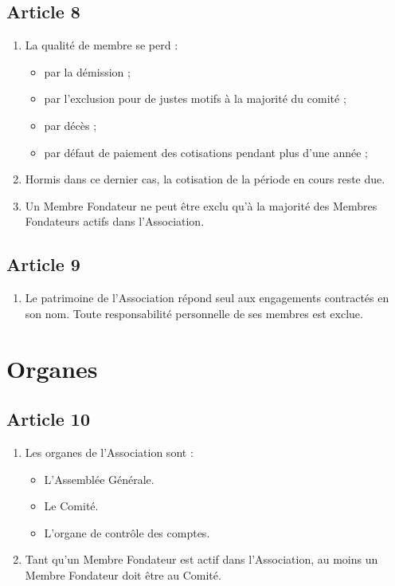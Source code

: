 \documentclass[12pt,twoside]{report}
\begin{document}
\subsection*{Article 8}
\begin{enumerate}
\item La qualité de membre se perd :
\begin{itemize}
\item par la démission ;
\item par l’exclusion pour de justes motifs à la majorité du comité ;
\item par décès ;
\item par défaut de paiement des cotisations pendant plus d'une année ;
\end{itemize}

\item Hormis dans ce dernier cas, la cotisation de la période en cours reste due.

\item Un Membre Fondateur ne peut être exclu qu’à la majorité des Membres Fondateurs actifs dans l’Association.
\end{enumerate}

\subsection*{Article 9}
\begin{enumerate}
\item Le patrimoine de l'Association répond seul aux engagements contractés en son nom. Toute responsabilité personnelle de ses membres est exclue.
\end{enumerate}

\section*{Organes}

\subsection*{Article 10}
\begin{enumerate}
\item Les organes de l’Association sont :
\begin{itemize}
\item L’Assemblée Générale.
\item Le Comité.
\item L’organe de contrôle des comptes.
\end{itemize}

\item Tant qu’un Membre Fondateur est actif dans l’Association, au moins un Membre Fondateur doit être au Comité.
\end{enumerate}
\end{document}

